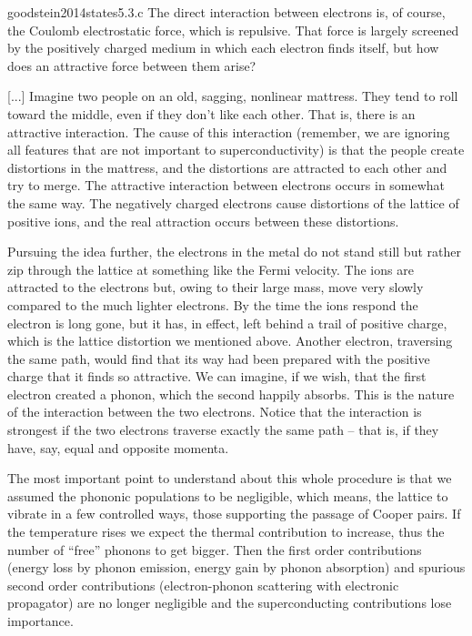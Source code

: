 \begin{cit}{goodstein2014states}{5.3.c}
	The direct interaction between electrons is, of course, the Coulomb electrostatic force, which is repulsive. That force is largely screened by the positively charged medium in which each electron finds itself, but how does an attractive force between them arise? 
	
	[...] Imagine two people on an old, sagging, nonlinear mattress. They tend to roll toward the middle, even if they don't like each other. That is, there is an attractive interaction. The cause of this interaction (remember, we are ignoring all features that are not important to superconductivity) is that the people create distortions in the mattress, and the distortions are attracted to each other and try to merge. The attractive interaction between electrons occurs in somewhat the same way. The negatively charged electrons cause distortions of the lattice of positive ions, and the real attraction occurs between these distortions.
	
	Pursuing the idea further, the electrons in the metal do not stand still but rather zip through the lattice at something like the Fermi velocity. The ions are attracted to the electrons but, owing to their large mass, move very slowly compared to the much lighter electrons. By the time the ions respond the electron is long gone, but it has, in effect, left behind a trail of positive charge, which is the lattice distortion we mentioned above. Another electron, traversing the same path, would find that its way had been prepared with the positive charge that it finds so attractive. We can imagine, if we wish, that the first electron created a phonon, which the second happily absorbs. This is the nature of the interaction between the two electrons. Notice that the interaction is strongest if the two electrons traverse exactly the same path -- that is, if they have, say, equal and opposite momenta.
\end{cit}

The most important point to understand about this whole procedure is that we assumed the phononic populations to be negligible, which means, the lattice to vibrate in a few controlled ways, those supporting the passage of Cooper pairs. If the temperature rises we expect the thermal contribution to increase, thus the number of ``free'' phonons to get bigger. Then the first order contributions (energy loss by phonon emission, energy gain by phonon absorption) and spurious second order contributions (electron-phonon scattering with electronic propagator) are no longer negligible and the superconducting contributions lose importance.

